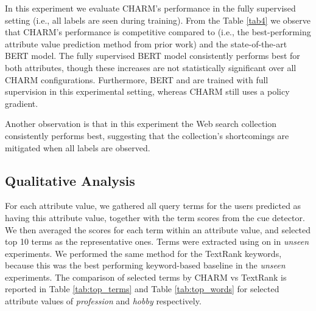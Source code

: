 In this experiment we evaluate CHARM's performance in the fully supervised setting (i.e., all labels are seen during training).
From the Table \ref{tab4} we observe that CHARM's performance is competitive compared to  (i.e., the best-performing attribute value prediction method from prior work) and the state-of-the-art BERT model.
The fully supervised BERT model consistently performs best for both attributes, though these increases are not statistically significant over all CHARM configurations. Furthermore, BERT and  are trained with full supervision in this experimental setting, whereas CHARM still uses a policy gradient.

Another observation is that in this experiment the Web search collection consistently performs best, suggesting that the collection's shortcomings are mitigated when all labels are observed.


\balance
\subsection{Qualitative Analysis}

For each attribute value, we gathered all query terms for the users predicted as having this attribute value, together with the term scores from the cue detector.
We then averaged the scores for each term within an attribute value, and selected top 10 terms as the representative ones. 
Terms were extracted using  on  in \emph{unseen} experiments.
We performed the same method for the TextRank keywords, because this was the best performing keyword-based baseline in the \emph{unseen} experiments.
The comparison of selected terms by CHARM vs TextRank is reported in Table \ref{tab:top_terms} and Table \ref{tab:top_words} for selected attribute values of \emph{profession} and \emph{hobby} respectively.


